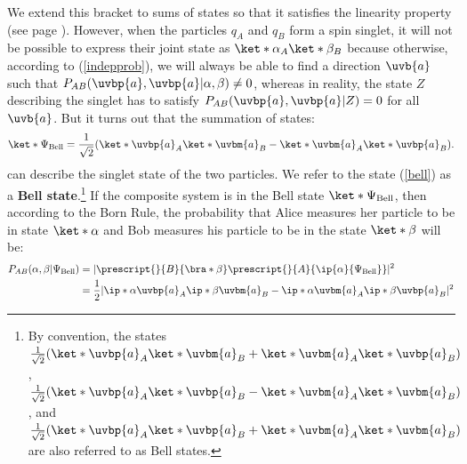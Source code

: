 \documentclass[12pt]{report}
\begin{document}
%
We extend this bracket to sums of states so that it satisfies the linearity property (see page \pageref{linearity}).
However, when the particles $q_A$ and $q_B$ form a spin singlet, it will not be possible to express their joint state as $\ket*{\alpha}_A\ket*{\beta}_B$ because otherwise, according to (\ref{indepprob}), we will always be able to find a direction $\uvb{a}$ such that $P_{AB}(\uvbp{a}, \uvbp{a}|\alpha, \beta)\neq 0$, whereas in reality, the state $Z$ describing the singlet has to satisfy $P_{AB}(\uvbp{a}, \uvbp{a}|Z)=0$ for all  $\uvb{a}$.
But it turns out that the summation of states:
\begin{equation}\label{bell}
    \ket*{\Psi_{\text{Bell}}}=\frac{1}{\sqrt{2}}(\ket*{\uvbp{a}}_A\ket*{\uvbm{a}}_B-\ket*{\uvbm{a}}_A\ket*{\uvbp{a}}_B).
\end{equation} %
%
can describe the singlet state of the two particles. We refer to the state (\ref{bell}) as a \textbf{Bell state}.\footnote{By convention, the states $ \frac{1}{\sqrt{2}}(\ket*{\uvbp{a}}_A\ket*{\uvbm{a}}_B+\ket*{\uvbm{a}}_A\ket*{\uvbp{a}}_B)$, $ \frac{1}{\sqrt{2}}(\ket*{\uvbp{a}}_A\ket*{\uvbp{a}}_B-\ket*{\uvbm{a}}_A\ket*{\uvbm{a}}_B)$, and $ \frac{1}{\sqrt{2}}(\ket*{\uvbp{a}}_A\ket*{\uvbp{a}}_B+\ket*{\uvbm{a}}_A\ket*{\uvbm{a}}_B)$ are also referred to as Bell states.} If the composite system is in the Bell state $\ket*{\Psi_{\text{Bell}}}$, then according to the Born Rule, the probability that Alice measures her particle to be in state $\ket*{\alpha}$ and Bob measures his particle to be in the state $\ket*{\beta}$ will be:
\begin{equation}
\begin{split}
    P_{AB}(\alpha, \beta|\Psi_{\text{Bell}})&=|\prescript{}{B}{ \bra*{\beta}}\prescript{}{A}{ \ip{\alpha}{\Psi_{\text{Bell}}}}|^2\\
        &=\frac{1}{2}|\ip*{\alpha}{\uvbp{a}}_A\ip*{\beta}{\uvbm{a}}_B-\ip*{\alpha}{\uvbm{a}}_A\ip*{\beta}{\uvbp{a}}_B|^2
\end{split}
\end{equation}
\end{document}
